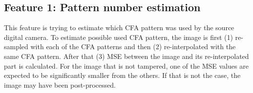 \documentclass{template/acm_proc_article-sp}
\begin{document}
\subsection{Feature 1: Pattern number estimation}
This feature is trying to estimate which CFA pattern was used by the source digital camera. To estimate possible used CFA pattern, the image is first (1) re-sampled with each of the CFA patterns and then (2) re-interpolated with the same CFA pattern. After that (3) MSE between the image and its re-interpolated part is calculated. For the image that is not tampered, one of the MSE values are expected to be significantly smaller from the others. If that is not the case, the image may have been post-processed.

\begin{figure}
    \centering


\end{figure}
\end{document}
